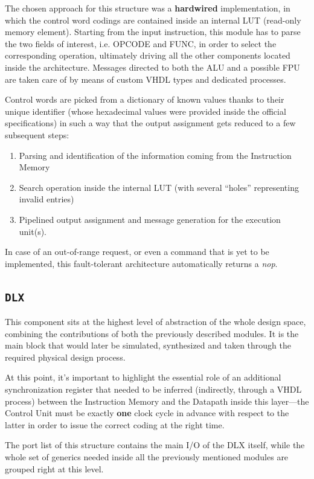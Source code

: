 \label{control-unit}
The chosen approach for this structure was a \textbf{hardwired} implementation, in which the control word codings are contained inside an internal LUT (read-only memory element). Starting from the input instruction, this module has to parse the two fields of interest, i.e. OPCODE and FUNC, in order to select the corresponding operation, ultimately driving all the other components located inside the architecture. Messages directed to both the ALU and a possible FPU are taken care of by means of custom VHDL types and dedicated processes.

Control words are picked from a dictionary of known values thanks to their unique identifier (whose hexadecimal values were provided inside the official specifications) in such a way that the output assignment gets reduced to a few subsequent steps:
\begin{enumerate}
\item Parsing and identification of the information coming from the Instruction Memory
\item Search operation inside the internal LUT (with several ``holes'' representing invalid entries)
\item Pipelined output assignment and message generation for the execution unit(s).
\end{enumerate}

In case of an out-of-range request, or even a command that is yet to be implemented, this fault-tolerant architecture automatically returns a \emph{nop}.

\subsection{\texttt{DLX}}
This component sits at the highest level of abstraction of the whole design space, combining the contributions of both the previously described modules. It is the main block that would later be simulated, synthesized and taken through the required physical design process.

\label{top-level}
At this point, it's important to highlight the essential role of an additional synchronization register that needed to be inferred (indirectly, through a VHDL process) between the Instruction Memory and the Datapath inside this layer—the Control Unit must be exactly \textbf{one} clock cycle in advance with respect to the latter in order to issue the correct coding at the right time.

The port list of this structure contains the main I/O of the DLX itself, while the whole set of generics needed inside all the previously mentioned modules are grouped right at this level.

